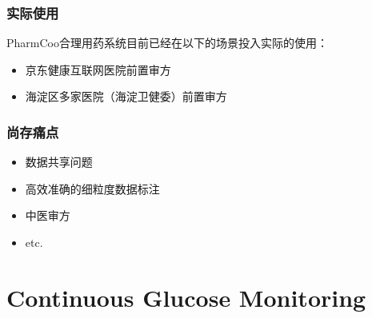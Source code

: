 
\begin{frame}
\frametitle{实际使用}

PharmCoo合理用药系统目前已经在以下的场景投入实际的使用：

\vspace{0.8em}

\begin{itemize}
    \item 京东健康互联网医院前置审方
    \item 海淀区多家医院（海淀卫健委）前置审方
\end{itemize}

\end{frame}


\begin{frame}
\frametitle{尚存痛点}

\begin{itemize}
    \item 数据共享问题
    \vspace{0.6em}
    \item {\color{green}高效}{\color{pink}准确}的{\color{red}细粒度}数据标注
    \vspace{0.6em}
    \item 中医审方
    \vspace{0.6em}
    \item etc.
\end{itemize}

\end{frame}


\section[CGM]{Continuous Glucose Monitoring}


